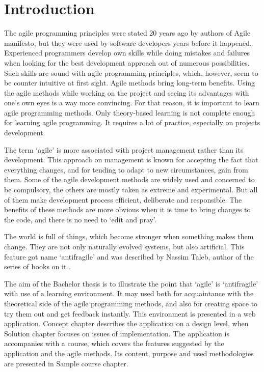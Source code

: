 \chapter*{Introduction} %

The agile programming principles were stated 20 years ago by authors of Agile manifesto, but they were used by software developers years before it happened. Experienced programmers develop own skills while doing mistakes and failures when looking for the best development approach out of numerous possibilities. Such skills are sound with agile programming principles, which, however, seem to be counter intuitive at first sight. Agile methods bring long-term benefits. Using the agile methods while working on the project and seeing its advantages with one's own eyes is a way more convincing. For that reason, it is important to learn agile programming methods. Only theory-based learning is not complete enough for learning agile programming. It requires a lot of practice, especially on projects development.

The term `agile' is more associated with project management rather than its development. This approach on management is known for accepting the fact that everything changes, and for tending to adapt to new circumstances, gain from them. Some of the agile development methods are widely used and concerned to be compulsory, the others are mostly taken as extreme and experimental. But all of them make development process efficient, deliberate and responsible. The benefits of these methods are more obvious when it is time to bring changes to the code, and there is no need to `edit and pray'.

The world is full of things, which become stronger when something makes them change. They are not only naturally evolved systems, but also artificial. This feature got name `antifragile' and was described by Nassim Taleb, author of the series of books on it \cite{antifragile}.

The aim of the Bachelor thesis is to illustrate the point that `agile' is `antifragile' with use of a learning environment. It may used both for acquaintance with the theoretical side of the agile programming methods, and also for creating space to try them out and get feedback instantly. This environment is presented in a web application. Concept chapter describes the application on a design level, when Solution chapter focuses on issues of implementation. The application is accompanies with a course, which covers the features suggested by the application and the agile methods. Its content, purpose and used methodologies are presented in Sample course chapter.
